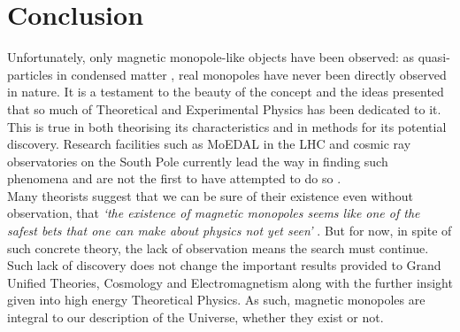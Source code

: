 \documentclass[twocolumn, 10pt]{article}
\begin{document}
\section{Conclusion}

Unfortunately, only magnetic monopole-like objects have been observed: as quasi-particles in condensed matter \cite{ray2015observation}, real monopoles have never been directly observed in nature. It is a testament to the beauty of the concept and the ideas presented that so much of Theoretical and Experimental Physics has been dedicated to it. This is true in both theorising its characteristics and in methods for its potential discovery. Research facilities such as MoEDAL in the LHC and cosmic ray observatories on the South Pole currently lead the way in finding such phenomena and are not the first to have attempted to do so \cite{rajantie2012introduction}. \\
\indent Many theorists suggest that we can be sure of their existence even without observation, that \textit{`the existence of magnetic monopoles seems like one of the safest bets that one can make about physics not yet seen'} \cite{Polchinski_2004}. But for now, in spite of such concrete theory, the lack of observation means the search must continue. Such lack of discovery does not change the important results provided to Grand Unified Theories, Cosmology and Electromagnetism along with the further insight given into high energy Theoretical Physics. As such, magnetic monopoles are integral to our description of the Universe, whether they exist or not.



\end{document}
